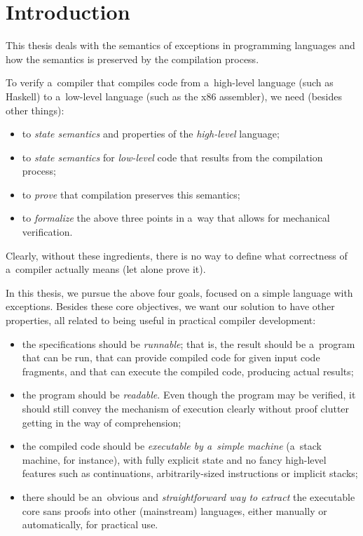 \chapter*{Introduction}


This thesis deals with the semantics of exceptions in programming languages and how the semantics
is preserved by the compilation process.

To verify a~compiler that compiles code from a~high-level language (such as Haskell)
to a~low-level language (such as the x86 assembler), we need (besides other things):
\begin{itemize}
	\item to \emph{state semantics} and properties of the \emph{high-level} language;
	\item to \emph{state semantics} for \emph{low-level} code that results from the compilation process;
	\item to \emph{prove} that compilation preserves this semantics;
	\item to \emph{formalize} the above three points in a~way that allows for mechanical verification.
\end{itemize}
Clearly, without these ingredients, there is no way to define what correctness of a~compiler actually
means (let alone prove it).

In this thesis, we pursue the above four goals, focused on a simple language with exceptions.
Besides these core objectives, we want our solution to have other properties, all related
to being useful in practical compiler development:

\begin{itemize}\label{objectives}

	\item the specifications should be \emph{runnable}; that is, the result should be a~program
		that can be run, that can provide compiled code for given input code fragments, and
		that can execute the compiled code, producing actual results;
		
	\item the program should be \emph{readable}. Even though the program may be verified,
		it should still convey the mechanism of execution clearly without proof clutter getting
		in the way of comprehension;
		
	\item the compiled code should be \emph{executable by a~simple machine} (a~stack machine,
		for instance), with fully explicit state and no fancy high-level features such as
		continuations, arbitrarily-sized instructions or implicit stacks;
		
	\item there should be an~obvious and \emph{straightforward way to extract} the executable core
		sans proofs into other (mainstream) languages, either manually or automatically,
		for practical use.
		
\end{itemize}

